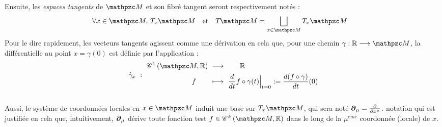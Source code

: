 Ensuite, les \emph{espaces tangents} de $\manu$  et son fibré tangent seront respectivement notés :
\begin{align}
	\qquad\qquad\qquad \forall x\in\manu,\ &\tg[x]{\manu}  & &\text{et}  &  \tg{\manu} &= \bigsqcup_{x\in\manu}\tg[x]{\manu} \qquad\qquad\qquad
\end{align} 
Pour le dire rapidement, les vecteurs tangents agissent comme une dérivation en cela que, pour une chemin $\gamma : \R\lr\manu$, la différentielle au point $x=\gamma(0)$ est définie par l'application :
\begin{equation} \label{eq:def2vec_tg}
	\dot{\gamma}_{x}\  :\ \begin{aligned}
		\conti[1]{\manu}{\R}\ &\lr\qquad \R \\ 
		f\qquad &\lmt\ \frac{d}{dt} f \circ\gamma(t)\Big|_{t=0} \defeq \frac{d(f \circ \gamma)}{dt}(0)
	\end{aligned}
\end{equation}
\\
Aussi, le système de coordonnées locales en $x\in\manu$ induit une base sur $\tg[x]{\manu}$, qui sera noté  $\boldsymbol{\partial}_\mu = \frac{\partial}{\partial x^\mu}$. notation qui est justifiée en cela que, intuitivement, $\boldsymbol{\partial}_\mu$ dérive toute fonction test $f\in\conti[k]{\manu}{\R}$ dans le long de la $\mu^{eme}$ coordonnée (locale) de $x$.
\\

